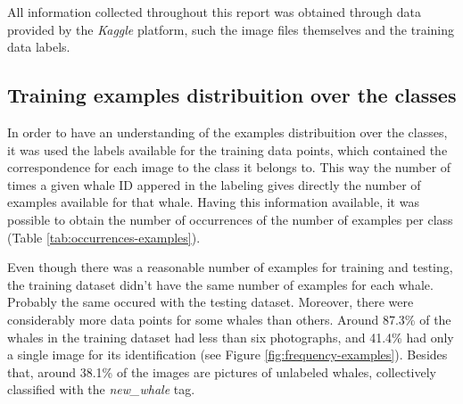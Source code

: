 \documentclass[12pt,
    brazil,			%
	english,        %
	]{article}
\begin{document}
All information collected throughout this report was obtained through data provided by the \textit{Kaggle} platform, such the image files themselves and the training data labels.

\subsection{Training examples distribuition over the classes}

In order to have an understanding of the examples distribuition over the classes, it was used the labels available for the training data points, which contained the correspondence for each image to the class it belongs to. This way the number of times a given whale ID appered in the labeling gives directly the number of examples available for that whale. Having this information available, it was possible to obtain the number of occurrences of the number of examples per class (Table \ref{tab:occurrences-examples}).

Even though there was a reasonable number of examples for training and testing, the training dataset didn't have the same number of examples for each whale. Probably the same occured with the testing dataset. Moreover, there were considerably more data points for some whales than others. Around 87.3\% of the whales in the training dataset had less than six photographs, and 41.4\% had only a single image for its identification (see Figure \ref{fig:frequency-examples}). Besides that, around 38.1\% of the images are pictures of unlabeled whales, collectively classified with the \textit{new\_whale} tag. 
\end{document}
